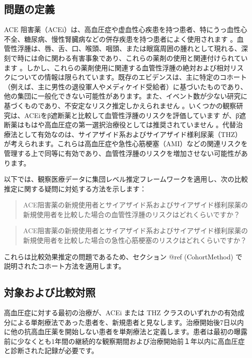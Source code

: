 \documentclass[
  11pt]{book}
\theoremstyle{definition}
\theoremstyle{definition}
\theoremstyle{definition}
\theoremstyle{definition}
\theoremstyle{remark}
\begin{document}
\subsection{問題の定義}\label{ux554fux984cux306eux5b9aux7fa9-1}

ACE 阻害薬（ACEi）は、高血圧症や虚血性心疾患を持つ患者、特にうっ血性心不全、糖尿病、慢性腎臓病などの併存疾患を持つ患者によく使用されます \citep{zaman_2002}。血管性浮腫は、唇、舌、口、喉頭、咽頭、または眼窩周囲の腫れとして現れる、深刻で時には命に関わる有害事象であり、これらの薬剤の使用と関連付けられています \citep{sabroe_1997}。しかし、これらの薬剤使用に関連する血管性浮腫の絶対および相対リスクについての情報は限られています。既存のエビデンスは、主に特定のコホート（例えば、主に男性の退役軍人やメディケイド受給者）に基づいたものであり、他の集団に一般化できない可能性があります。また、イベント数が少ない研究に基づくものであり、不安定なリスク推定しかえられません \citep{powers_2012}。いくつかの観察研究は、ACEiをβ遮断薬と比較して血管性浮腫のリスクを評価しています \citep{magid_2010, toh_2012}が、β遮断薬はもはや高血圧症の第一選択治療役としては推奨されていません \citep{whelton_2018}。代替治療法として有効なのは、サイアザイド系およびサイアザイド様利尿薬（THZ）が考えられます。これらは高血圧症や急性心筋梗塞（AMI）などの関連リスクを管理する上で同等に有効であり、血管性浮腫のリスクを増加させない可能性があります。

以下では、観察医療データに集団レベル推定フレームワークを適用し、次の比較推定に関する疑問に対処する方法を示します：

\begin{quote}
ACE阻害薬の新規使用者とサイアザイド系およびサイアザイド様利尿薬の新規使用者を比較した場合の血管性浮腫のリスクはどれくらいですか？
\end{quote}

\begin{quote}
ACE阻害薬の新規使用者とサイアザイド系およびサイアザイド様利尿薬の新規使用者を比較した場合の急性心筋梗塞のリスクはどれくらいですか？
\end{quote}

これらは比較効果推定の問題であるため、セクション @ref (CohortMethod) で説明されたコホート方法を適用します。

\subsection{対象および比較対照}\label{ux5bfeux8c61ux304aux3088ux3073ux6bd4ux8f03ux5bfeux7167}

高血圧症に対する最初の治療が、ACEi または THZ クラスのいずれかの有効成分による単剤療法であった患者を、新規患者と見なします。治療開始後7日以内に他の抗高血圧薬を開始しない患者を単剤療法と定義します。患者は最初の曝露前に少なくとも1年間の継続的な観察期間および治療開始前１年以内に高血圧症と診断された記録が必要です。
\end{document}
